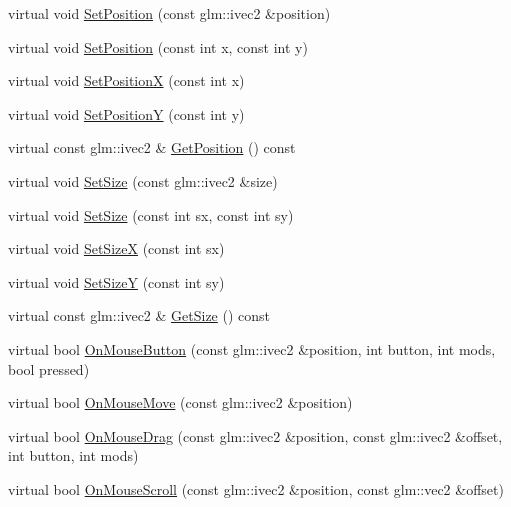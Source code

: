 \begin{DoxyCompactItemize}
\item 
virtual void \mbox{\hyperlink{classngl__gui_1_1_widget_acdc4ede81f89c4f5a22a6f372e6a34d7}{Set\+Position}} (const glm\+::ivec2 \&position)
\item 
virtual void \mbox{\hyperlink{classngl__gui_1_1_widget_ae93bf12ee5a55bce3519ea8ac888b73c}{Set\+Position}} (const int x, const int y)
\item 
virtual void \mbox{\hyperlink{classngl__gui_1_1_widget_a7b1cbd77bb35297b20048a68bd385f6f}{Set\+PositionX}} (const int x)
\item 
virtual void \mbox{\hyperlink{classngl__gui_1_1_widget_a9f2d5df091e4b012ba95f296e14dc720}{Set\+PositionY}} (const int y)
\item 
virtual const glm\+::ivec2 \& \mbox{\hyperlink{classngl__gui_1_1_widget_ac4f06cebc7d48d43774926da1e994281}{Get\+Position}} () const
\item 
virtual void \mbox{\hyperlink{classngl__gui_1_1_widget_ac86121806bd92e3097d8f58212510bbb}{Set\+Size}} (const glm\+::ivec2 \&size)
\item 
virtual void \mbox{\hyperlink{classngl__gui_1_1_widget_aaf58999336d157fc651e328d594dbe37}{Set\+Size}} (const int sx, const int sy)
\item 
virtual void \mbox{\hyperlink{classngl__gui_1_1_widget_a9c49a781241d314841f455abf4c88983}{Set\+SizeX}} (const int sx)
\item 
virtual void \mbox{\hyperlink{classngl__gui_1_1_widget_acae81cd9e22ed62e665a48aceb3ddda1}{Set\+SizeY}} (const int sy)
\item 
virtual const glm\+::ivec2 \& \mbox{\hyperlink{classngl__gui_1_1_widget_acc8ec6c7cdc2ceef6f0523308131a974}{Get\+Size}} () const
\item 
virtual bool \mbox{\hyperlink{classngl__gui_1_1_widget_a721b18dc7a09b0b7b4ff0c02162409b8}{On\+Mouse\+Button}} (const glm\+::ivec2 \&position, int button, int mods, bool pressed)
\item 
virtual bool \mbox{\hyperlink{classngl__gui_1_1_widget_ac5d4927cc0bd0300d0b2e00d9f64d176}{On\+Mouse\+Move}} (const glm\+::ivec2 \&position)
\item 
virtual bool \mbox{\hyperlink{classngl__gui_1_1_widget_aac19447b726ccec8ea22992b19edc676}{On\+Mouse\+Drag}} (const glm\+::ivec2 \&position, const glm\+::ivec2 \&offset, int button, int mods)
\item 
virtual bool \mbox{\hyperlink{classngl__gui_1_1_widget_a754155677479020794938b90229aba58}{On\+Mouse\+Scroll}} (const glm\+::ivec2 \&position, const glm\+::vec2 \&offset)

\end{DoxyCompactItemize}
